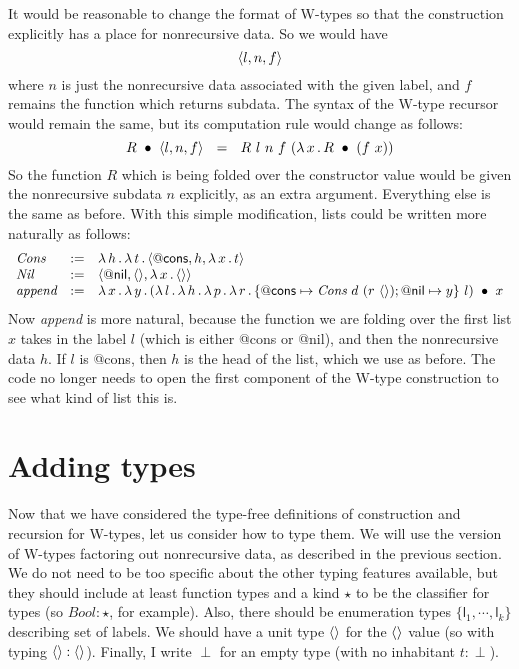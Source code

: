 \documentclass{article}
\begin{document}
It would be reasonable to change the format of W-types so that the construction explicitly has a place for nonrecursive data.  So we would have
\[
\langle l , n, f \rangle
\]
\noindent where $n$ is just the nonrecursive data associated with the given label, and $f$ remains the function which returns subdata.  The syntax of the W-type recursor would remain the same, but its computation rule would change as follows:
\[
\wrec{R}{\ctora{l}{n}{f}} \ \ = \ \ R\ l\ n\ f\ (\lam{x}{\wrec{R}{(f\ x)}})
\]
\noindent So the function $R$ which is being folded over the constructor value would be given
the nonrecursive subdata $n$ explicitly, as an extra argument.  Everything else is the same
as before.  With this simple modification, lists could be written more naturally as
follows:
\[
\begin{array}{lll}
\textit{Cons} & := & \lambda\, h\, .\, \lambda\, t\, .\, \langle \mathsf{@cons} , h, \lambda\, x\, .\, t \rangle \\
\textit{Nil} & := & \langle \mathsf{@nil} , \langle\rangle, \lambda\, x\, .\, \langle\rangle \rangle \\
\textit{append} & := & \lambda\, x\, .\, \lambda\, y\, .\, (\lambda\, l\, .\, \lambda\, h\, .\, \lambda\, p\, .\, \lambda\, r\, .\, \{ \mathsf{@cons}\mapsto \textit{Cons}\ d\ (r\ \langle\rangle); \mathsf{@nil}\mapsto y\}\ l)\ \bullet\ x
\end{array}
\]
\noindent Now \textit{append} is more natural, because the function we are folding over the first list $x$ takes in the label $l$ (which is either \textsf{@cons} or \textsf{@nil}), and then the nonrecursive data $h$.  If $l$ is \textsf{@cons}, then $h$ is the head of the list, which we
use as before.  The code no longer needs to open the first component of the W-type construction to see what kind of list this is.

\section{Adding types}

Now that we have considered the type-free definitions of construction
and recursion for W-types, let us consider how to type them.  We will
use the version of W-types factoring out nonrecursive data, as
described in the previous section.  We do not need to be too specific
about the other typing features available, but they should include at
least function types and a kind $\star$ to be the classifier for
types (so $\textit{Bool} : \star$, for example).  Also, there should
be enumeration types $\{\mathsf{l}_1 , \cdots , \mathsf{l}_k\}$ describing
set of labels.  We should have a unit type $\langle\rangle$ for the $\langle\rangle$ value (so with typing
$\langle\rangle : \langle\rangle$).  Finally, I write $\perp$ for an empty type (with no
inhabitant $t : \perp$).
\end{document}

